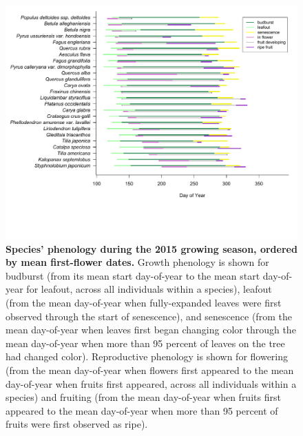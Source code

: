 \documentclass{article}
\begin{document}
\begin{figure}[h]
  \centering
  \includegraphics{../analyses/figures/grosea_repsort_ripefruit_legend.pdf}
  \caption{\textbf{Species' phenology during the 2015 growing season, ordered by mean first-flower dates.} Growth phenology is shown for budburst (from its mean start day-of-year to the mean start day-of-year for leafout, across all individuals within a species), leafout (from the mean day-of-year when fully-expanded leaves were first observed through the start of senescence), and senescence (from the mean day-of-year when leaves first began changing color through the mean day-of-year when more than 95 percent of leaves on the tree had changed color). Reproductive phenology is shown for flowering (from the mean day-of-year when flowers first appeared to the mean day-of-year when fruits first appeared, across all individuals within a species) and fruiting (from the mean day-of-year when fruits first appeared to the mean day-of-year when more than 95 percent of fruits were first observed as ripe).}
  \label{fig:focsp}
\end{figure}
  
\end{document}
